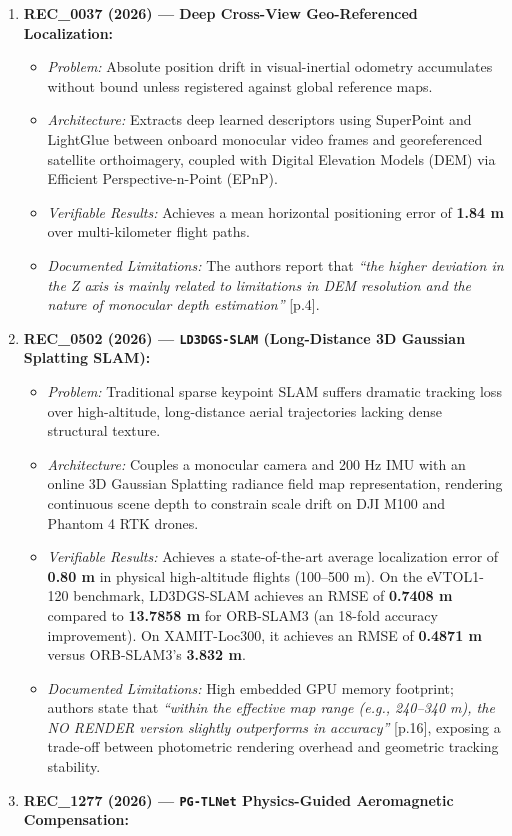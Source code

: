 \documentclass[journal]{IEEEtran}
\begin{document}
\begin{enumerate}
\def\labelenumi{\arabic{enumi}.}
\tightlist
\item
  \textbf{REC\_0037 (2026) --- Deep Cross-View Geo-Referenced
  Localization:}

  \begin{itemize}
  \tightlist
  \item
    \emph{Problem:} Absolute position drift in visual-inertial odometry
    accumulates without bound unless registered against global reference
    maps.
  \item
    \emph{Architecture:} Extracts deep learned descriptors using
    SuperPoint and LightGlue between onboard monocular video frames and
    georeferenced satellite orthoimagery, coupled with Digital Elevation
    Models (DEM) via Efficient Perspective-n-Point (EPnP).
  \item
    \emph{Verifiable Results:} Achieves a mean horizontal positioning
    error of \textbf{1.84 m} over multi-kilometer flight paths.
  \item
    \emph{Documented Limitations:} The authors report that \emph{``the
    higher deviation in the Z axis is mainly related to limitations in
    DEM resolution and the nature of monocular depth estimation''}
    {[}p.4{]}.
  \end{itemize}
\item
  \textbf{REC\_0502 (2026) --- \texttt{LD3DGS-SLAM} (Long-Distance 3D
  Gaussian Splatting SLAM):}

  \begin{itemize}
  \tightlist
  \item
    \emph{Problem:} Traditional sparse keypoint SLAM suffers dramatic
    tracking loss over high-altitude, long-distance aerial trajectories
    lacking dense structural texture.
  \item
    \emph{Architecture:} Couples a monocular camera and 200 Hz IMU with
    an online 3D Gaussian Splatting radiance field map representation,
    rendering continuous scene depth to constrain scale drift on DJI
    M100 and Phantom 4 RTK drones.
  \item
    \emph{Verifiable Results:} Achieves a state-of-the-art average
    localization error of \textbf{0.80 m} in physical high-altitude
    flights (100--500 m). On the eVTOL1-120 benchmark, LD3DGS-SLAM
    achieves an RMSE of \textbf{0.7408 m} compared to \textbf{13.7858 m}
    for ORB-SLAM3 (an 18-fold accuracy improvement). On XAMIT-Loc300, it
    achieves an RMSE of \textbf{0.4871 m} versus ORB-SLAM3's
    \textbf{3.832 m}.
  \item
    \emph{Documented Limitations:} High embedded GPU memory footprint;
    authors state that \emph{``within the effective map range (e.g.,
    240--340 m), the NO RENDER version slightly outperforms in
    accuracy''} {[}p.16{]}, exposing a trade-off between photometric
    rendering overhead and geometric tracking stability.
  \end{itemize}
\item
  \textbf{REC\_1277 (2026) --- \texttt{PG-TLNet} Physics-Guided
  Aeromagnetic Compensation:}


\end{enumerate}
\end{document}
